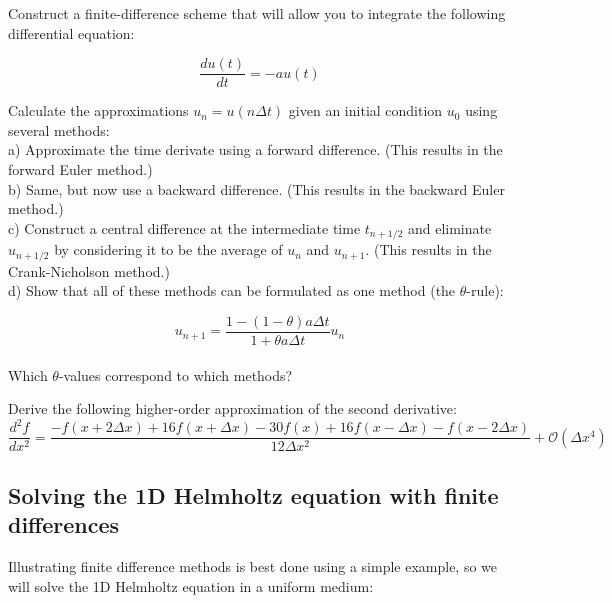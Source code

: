 \begin{sidebar}
\begin{ex}
Construct a finite-difference scheme that will allow you to integrate the following differential equation:

$$\frac{du(t)}{dt} = -a u(t)$$

Calculate the approximations $u_n = u(n \Delta t)$ given an initial condition $u_0$ using several methods: \\

a) Approximate the time derivate using a forward difference. (This results in the forward Euler method.) \\

b) Same, but now use a backward difference. (This results in the backward Euler method.)\\

c) Construct a central difference at the intermediate time $t_{n+1/2}$ and eliminate $u_{n+1/2}$ by considering it to be the average of $u_{n}$ and $u_{n+1}$. (This results in the Crank-Nicholson method.) \\

d) Show that all of these methods can be formulated as one method (the $\theta$-rule):

$$u_{n+1} = \frac{1-(1-\theta) a \Delta t}{1+ \theta a \Delta t} u_n$$ \\

Which $\theta$-values correspond to which methods?

\end{ex}
\end{sidebar}

\begin{sidebar}
\begin{ex}
Derive the following higher-order approximation of the second derivative:
$$\frac{d^2 f}{d x^2} = \frac{-f(x + 2 \Delta x) + 16 f(x + \Delta x) -30 f(x) + 16 f(x- \Delta x) - f(x - 2 \Delta x)}{12 \Delta x^2} + \mathcal{O}\left(\Delta x^4\right) $$
\end{ex}
\end{sidebar}


\subsection{Solving the 1D Helmholtz equation with finite differences}

Illustrating finite difference methods is best done using a simple example, so we will solve the 1D Helmholtz equation in a uniform medium:

